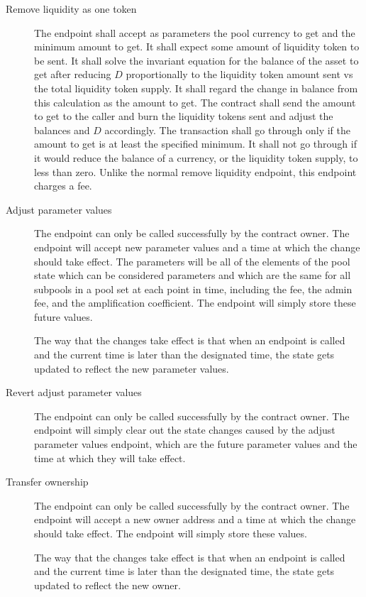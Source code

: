 \documentclass[12pt]{article}
\begin{document}
\begin{description}
	\item[Remove liquidity as one token] The endpoint shall accept as parameters the pool currency to get and the minimum amount to get. It shall expect some amount of liquidity token to be sent. It shall solve the invariant equation for the balance of the asset to get after reducing $D$ proportionally to the liquidity token amount sent vs the total liquidity token supply. It shall regard the change in balance from this calculation as the amount to get. The contract shall send the amount to get to the caller and burn the liquidity tokens sent and adjust the balances and $D$ accordingly. The transaction shall go through only if the amount to get is at least the specified minimum. It shall not go through if it would reduce the balance of a currency, or the liquidity token supply, to less than zero. Unlike the normal remove liquidity endpoint, this endpoint charges a fee.

	\item[Adjust parameter values] The endpoint can only be called successfully by the contract owner. The endpoint will accept new parameter values and a time at which the change should take effect. The parameters will be all of the elements of the pool state which can be considered parameters and which are the same for all subpools in a pool set at each point in time, including the fee, the admin fee, and the amplification coefficient. The endpoint will simply store these future values.

The way that the changes take effect is that when an endpoint is called and the current time is later than the designated time, the state gets updated to reflect the new parameter values.

	\item[Revert adjust parameter values] The endpoint can only be called successfully by the contract owner. The endpoint will simply clear out the state changes caused by the adjust parameter values endpoint, which are the future parameter values and the time at which they will take effect.

	\item[Transfer ownership] The endpoint can only be called successfully by the contract owner. The endpoint will accept a new owner address and a time at which the change should take effect. The endpoint will simply store these values.

The way that the changes take effect is that when an endpoint is called and the current time is later than the designated time, the state gets updated to reflect the new owner.


\end{description}
\end{document}
